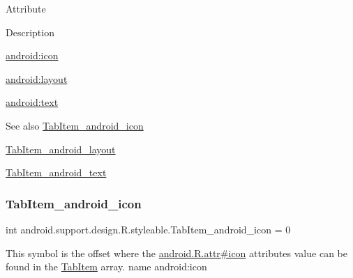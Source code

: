 Attribute

Description 

{\ttfamily \hyperlink{classandroid_1_1support_1_1design_1_1R_1_1styleable_a4ae9b477045359eaafd1e5190d205b23}{android\+:icon}}

{\ttfamily \hyperlink{classandroid_1_1support_1_1design_1_1R_1_1styleable_ad532b6a8667261e64cc67f83928037dd}{android\+:layout}}

{\ttfamily \hyperlink{classandroid_1_1support_1_1design_1_1R_1_1styleable_acc3aa4481a2a0607245faab284197fcf}{android\+:text}}

\begin{DoxySeeAlso}{See also}
\hyperlink{classandroid_1_1support_1_1design_1_1R_1_1styleable_a4ae9b477045359eaafd1e5190d205b23}{Tab\+Item\+\_\+android\+\_\+icon} 

\hyperlink{classandroid_1_1support_1_1design_1_1R_1_1styleable_ad532b6a8667261e64cc67f83928037dd}{Tab\+Item\+\_\+android\+\_\+layout} 

\hyperlink{classandroid_1_1support_1_1design_1_1R_1_1styleable_acc3aa4481a2a0607245faab284197fcf}{Tab\+Item\+\_\+android\+\_\+text} 
\end{DoxySeeAlso}
\mbox{\label{classandroid_1_1support_1_1design_1_1R_1_1styleable_a4ae9b477045359eaafd1e5190d205b23}} 
\subsubsection{\texorpdfstring{Tab\+Item\+\_\+android\+\_\+icon}{TabItem\_android\_icon}}
{\footnotesize\ttfamily int android.\+support.\+design.\+R.\+styleable.\+Tab\+Item\+\_\+android\+\_\+icon = 0\hspace{0.3cm}{\ttfamily [static]}}

This symbol is the offset where the \hyperlink{}{android.\+R.\+attr\#icon} attribute\textquotesingle{}s value can be found in the \hyperlink{classandroid_1_1support_1_1design_1_1R_1_1styleable_a244f187ed8d4ed589f36e6db741d19e8}{Tab\+Item} array.  name android\+:icon \mbox{\label{classandroid_1_1support_1_1design_1_1R_1_1styleable_ad532b6a8667261e64cc67f83928037dd}} 
